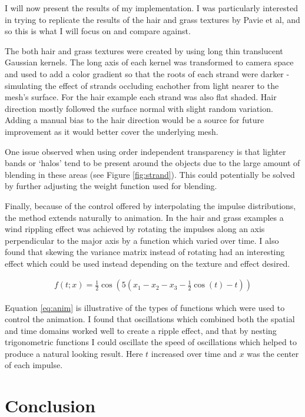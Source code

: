 \documentclass{article}
\begin{document}
I will now present the results of my implementation. I was particularly interested in trying to replicate the results of the hair and grass textures by Pavie et al, and so this is what I will focus on and compare against.

The both hair and grass textures were created by using long thin translucent Gaussian kernels. The long axis of each kernel was transformed to camera space and used to add a color gradient so that the roots of each strand were darker - simulating the effect of strands occluding eachother from light nearer to the mesh's surface. For the hair example each strand was also flat shaded. Hair direction mostly followed the surface normal with slight random variation. Adding a manual bias to the hair direction would be a source for future improvement as it would better cover the underlying mesh.

One issue observed when using order independent transparency is that lighter bands or `halos' tend to be present around the objects due to the large amount of blending in these areas (see Figure \ref{fig:strand}). This could potentially be solved by further adjusting the weight function used for blending.

Finally, because of the control offered by interpolating the impulse distributions, the method extends naturally to animation. In the hair and grass examples a wind rippling effect was achieved by rotating the impulses along an axis perpendicular to the major axis by a function which varied over time. I also found that skewing the variance matrix instead of rotating had an interesting effect which could be used instead depending on the texture and effect desired.

\begin{align} \label{eq:anim}
    f(t;x) = \frac12\cos\left(5(x_1-x_2-x_3-\frac12\cos(t)-t)\right)
\end{align}

Equation \ref{eq:anim} is illustrative of the types of functions which were used to control the animation. I found that oscillations which combined both the spatial and time domains worked well to create a ripple effect, and that by nesting trigonometric functions I could oscillate the speed of oscillations which helped to produce a natural looking result. Here $t$ increased over time and $x$ was the center of each impulse.


\section{Conclusion}
\end{document}
